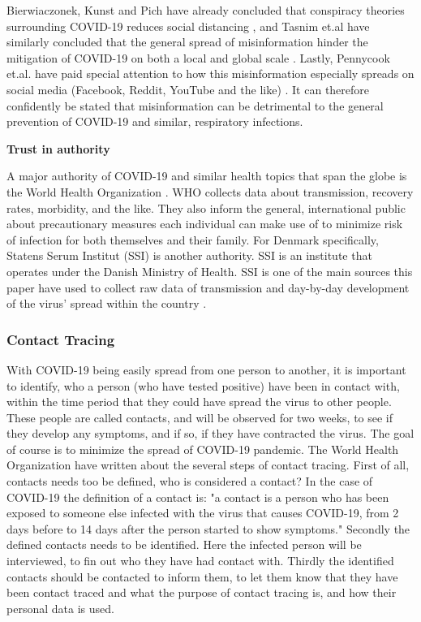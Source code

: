 Bierwiaczonek, Kunst and Pich have already concluded that conspiracy theories surrounding COVID-19 reduces social distancing \citep{bierwiaczonek_belief_nodate}, and Tasnim et.al have similarly concluded that the general spread of misinformation hinder the mitigation of COVID-19 on both a local and global scale \citep{tasnim_impact_2020}. Lastly, Pennycook et.al. have paid special attention to how this misinformation especially spreads on social media (Facebook, Reddit, YouTube and the like) \citep{pennycook_fighting_2020}. It can therefore confidently be stated that misinformation can be detrimental to the general prevention of COVID-19 and similar, respiratory infections.




\textbf{Trust in authority}

A major authority of COVID-19 and similar health topics that span the globe is the World Health Organization \citep{who_home_nodate}. WHO collects data about transmission, recovery rates, morbidity, and the like. They also inform the general, international public about precautionary measures each individual can make use of to minimize risk of infection for both themselves and their family. 
For Denmark specifically, Statens Serum Institut (SSI) is another authority. SSI is an institute that operates under the Danish Ministry of Health. SSI is one of the main sources this paper have used to collect raw data of transmission and day-by-day development of the virus’ spread within the country \citep{ssi_statens_nodate}.




\subsubsection{Contact Tracing} \label{Contact Tracing}
With COVID-19 being easily spread from one person to another, it is important to identify, who a person (who have tested positive) have been in contact with, within the time period that they could have spread the virus to other people. These people are called contacts, and will be observed for two weeks, to see if they develop any symptoms, and if so, if they have contracted the virus. The goal of course is to minimize the spread of COVID-19 pandemic.\citep{who_hq_coronavirus_2020}
The World Health Organization have written about the several steps of contact tracing.\newline
First of all, contacts needs too be defined, who is considered a contact? In the case of COVID-19 the definition of a contact is: "a contact is a person who has been exposed to someone else infected with the virus that causes COVID-19, from 2 days before to 14 days after the person started to show symptoms."\citep{who_headquarters_coronavirus_2020}\newline
Secondly the defined contacts needs to be identified. Here the infected person will be interviewed, to fin out who they have had contact with.\newline
Thirdly the identified contacts should be contacted to inform them, to let them know that they have been contact traced and what the purpose of contact tracing is, and how their personal data is used.



